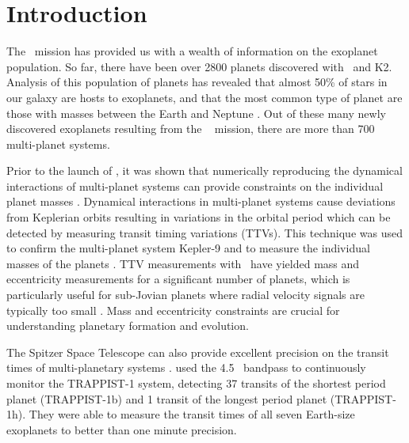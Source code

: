 \section{Introduction}


The \Kepler~mission \citep{Borucki2010} has provided us with a wealth of information on the exoplanet population. So far, there have been over 2800 planets discovered with \Kepler~and K2. Analysis of this population of planets has revealed that almost 50\% of stars in our galaxy are hosts to exoplanets, and that the most common type of planet are those with masses between the Earth and Neptune \citep{Batalha2013, Batalha2014, Fressin2013, Petigura2013a, Petigura2013b}. Out of these many newly discovered exoplanets resulting from the \Kepler~ mission, there are more than 700 multi-planet systems.

Prior to the launch of \Kepler, it was shown that numerically reproducing the dynamical interactions of multi-planet systems can provide constraints on the individual planet masses \citep{Holman2005, Agol2005}. Dynamical interactions in multi-planet systems cause deviations from Keplerian orbits resulting in variations in the orbital period which can be detected by measuring transit timing variations (TTVs). This technique was used to confirm the multi-planet system Kepler-9 and to measure the individual masses of the planets \citep{Holman2010}. TTV measurements with \Kepler~have yielded mass and eccentricity measurements for a significant number of planets, which is particularly useful for sub-Jovian planets where radial velocity signals are typically too small \citep{Jontof-Hutter2016,Hadden2017}. Mass and eccentricity constraints are crucial for understanding planetary formation and evolution.

The Spitzer Space Telescope can also provide excellent precision on the transit times of multi-planetary systems \citep[e.g.,][]{Beichman2016, Gillon2017, Berardo2019}. \citet{Gillon2017} used the 4.5\um~ bandpass to continuously monitor the TRAPPIST-1 system, detecting 37 transits of the shortest period planet (TRAPPIST-1b) and 1 transit of the longest period planet (TRAPPIST-1h). They were able to measure the transit times of all seven Earth-size exoplanets to better than one minute precision.

